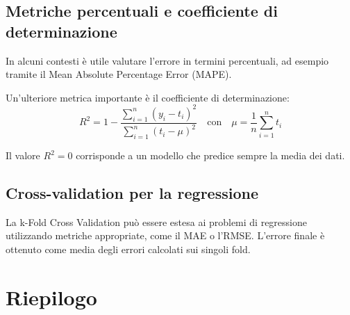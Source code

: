 \documentclass[a4paper,12pt]{report}
\begin{document}
\subsection{Metriche percentuali e coefficiente di determinazione}

In alcuni contesti è utile valutare l’errore in termini percentuali, ad esempio tramite il Mean Absolute Percentage Error (MAPE).

Un’ulteriore metrica importante è il coefficiente di determinazione:
\[
R^2 = 1 - \frac{\sum_{i=1}^{n} (y_i - t_i)^2}{\sum_{i=1}^{n} (t_i - \mu)^2}
\quad \text{con} \quad
\mu = \frac{1}{n} \sum_{i=1}^{n} t_i
\]

Il valore \( R^2 = 0 \) corrisponde a un modello che predice sempre la media dei dati.


\subsection{Cross-validation per la regressione}

La k-Fold Cross Validation può essere estesa ai problemi di regressione utilizzando metriche appropriate, come il MAE o l’RMSE.
L’errore finale è ottenuto come media degli errori calcolati sui singoli fold.

\section*{Riepilogo}
\end{document}
